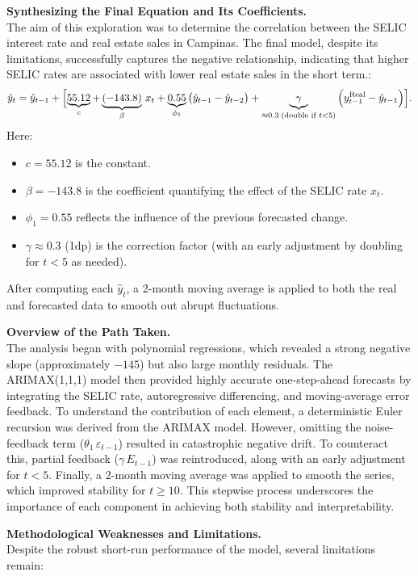 \documentclass{article}
\begin{document}
\textbf{Synthesizing the Final Equation and Its Coefficients.}\\[1mm]
The aim of this exploration was to determine the correlation between the SELIC interest rate and real estate sales in Campinas. The final model, despite its limitations, successfully captures the negative relationship, indicating that higher SELIC rates are associated with lower real estate sales in the short term.:
\[
\hat{y}_t = \hat{y}_{t-1} + \Bigl[
    \underbrace{55.12}_{c} 
    + \underbrace{(-143.8)}_{\beta}\,x_t 
    + \underbrace{0.55}_{\phi_1}\,\bigl(\hat{y}_{t-1} - \hat{y}_{t-2}\bigr)
    + \underbrace{\gamma}_{\approx 0.3\;(\text{double if }t<5)}\,\Bigl(y_{t-1}^\mathrm{Real} - \hat{y}_{t-1}\Bigr)
\Bigr].
\]
Here:
\begin{itemize}
    \item \(c = 55.12\) is the constant.
    \item \(\beta = -143.8\) is the coefficient quantifying the effect of the SELIC rate \(x_t\).
    \item \(\phi_1 = 0.55\) reflects the influence of the previous forecasted change.
    \item \(\gamma \approx 0.3\) (1dp) is the correction factor (with an early adjustment by doubling for \(t<5\) as needed).
\end{itemize}
After computing each \(\hat{y}_t\), a 2-month moving average is applied to both the real and forecasted data to smooth out abrupt fluctuations.

\textbf{Overview of the Path Taken.}\\[1mm]
The analysis began with polynomial regressions, which revealed a strong negative slope (approximately \(-145\)) but also large monthly residuals. The ARIMAX(1,1,1) model then provided highly accurate one-step-ahead forecasts by integrating the SELIC rate, autoregressive differencing, and moving-average error feedback. To understand the contribution of each element, a deterministic Euler recursion was derived from the ARIMAX model. However, omitting the noise-feedback term (\(\theta_1\,\varepsilon_{t-1}\)) resulted in catastrophic negative drift. To counteract this, partial feedback (\(\gamma\,E_{t-1}\)) was reintroduced, along with an early adjustment for \(t<5\). Finally, a 2-month moving average was applied to smooth the series, which improved stability for \(t \geq 10\). This stepwise process underscores the importance of each component in achieving both stability and interpretability.

\textbf{Methodological Weaknesses and Limitations.}\\[1mm]
Despite the robust short-run performance of the model, several limitations remain:
\end{document}
